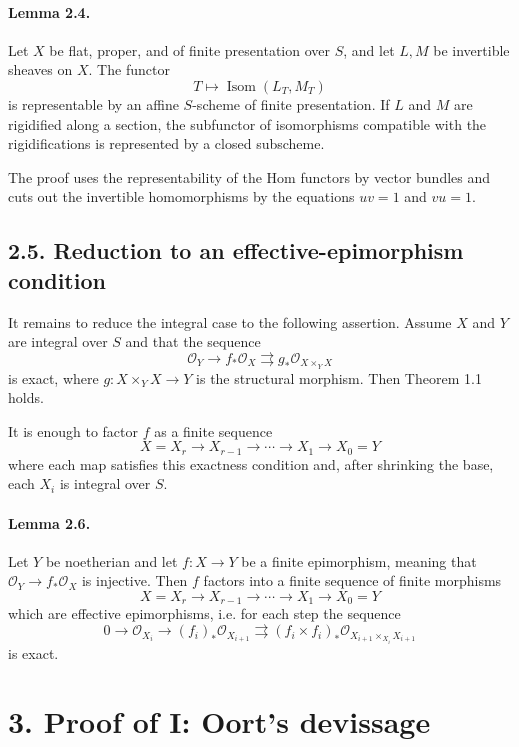 \documentclass[12pt]{article}
\newcommand{\cO}{\mathcal O}
\newcommand{\Isom}{\operatorname{Isom}}
\newcommand{\longto}{\longrightarrow}
\begin{document}
\paragraph{Lemma 2.4.}
Let $X$ be flat, proper, and of finite presentation over $S$, and let $L,M$ be invertible sheaves on $X$. The functor
\[
T\longmapsto \Isom(L_T,M_T)
\]
is representable by an affine $S$-scheme of finite presentation. If $L$ and $M$ are rigidified along a section, the subfunctor of isomorphisms compatible with the rigidifications is represented by a closed subscheme.

The proof uses the representability of the Hom functors by vector bundles and cuts out the invertible homomorphisms by the equations $uv=1$ and $vu=1$.

\subsection*{2.5. Reduction to an effective-epimorphism condition}

It remains to reduce the integral case to the following assertion. Assume $X$ and $Y$ are integral over $S$ and that the sequence
\[
\cO_Y\longto f_*\cO_X\rightrightarrows g_*\cO_{X\times_YX}
\]
is exact, where $g:X\times_YX\to Y$ is the structural morphism. Then Theorem 1.1 holds.

It is enough to factor $f$ as a finite sequence
\[
X=X_r\to X_{r-1}\to\cdots\to X_1\to X_0=Y
\]
where each map satisfies this exactness condition and, after shrinking the base, each $X_i$ is integral over $S$.

\paragraph{Lemma 2.6.}
Let $Y$ be noetherian and let $f:X\to Y$ be a finite epimorphism, meaning that $\cO_Y\to f_*\cO_X$ is injective. Then $f$ factors into a finite sequence of finite morphisms
\[
X=X_r\to X_{r-1}\to\cdots\to X_1\to X_0=Y
\]
which are effective epimorphisms, i.e. for each step the sequence
\[
0\to\cO_{X_i}\to (f_i)_*\cO_{X_{i+1}}
\rightrightarrows
(f_i\times f_i)_*\cO_{X_{i+1}\times_{X_i}X_{i+1}}
\]
is exact.



\section*{3. Proof of I: Oort's devissage}
\end{document}
